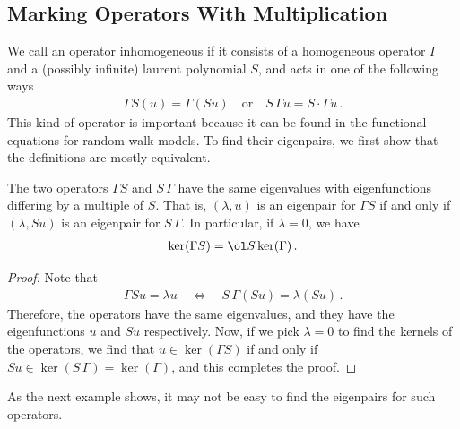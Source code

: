\subsection{Marking Operators With Multiplication}
We call an operator inhomogeneous if it consists of a homogeneous operator $\Gamma$ and a (possibly infinite) laurent polynomial $S$, and acts in one of the following ways
 \begin{align}
	\Gamma S(u) = \Gamma(Su)\quad\text{or}\quad S\,\Gamma u = S\cdot \Gamma u\,.
 \end{align}
This kind of operator is important because it can be found in the functional equations for random walk models. To find their eigenpairs, we first show that the definitions are mostly equivalent.
\begin{prop} The two operators $\Gamma S$ and $S\, \Gamma$ have the same eigenvalues with eigenfunctions differing by a multiple of $S$. That is, $(\lambda,u)$ is an eigenpair for $\Gamma S$ if and only if $(\lambda, Su)$ is an eigenpair for $S\,\Gamma$. In particular, if $\lambda = 0$, we have
\begin{align}
	\ker(\Gamma S) = \ol S \ker(\Gamma)\,.
\end{align}
\end{prop}
\begin{proof} Note that
\begin{align}
	\Gamma Su = \lambda u \quad \Longleftrightarrow \quad S\,\Gamma (Su) = \lambda (Su)\,.
\end{align}
Therefore, the operators have the same eigenvalues, and they have the eigenfunctions $u$ and $Su$ respectively. Now, if we pick $\lambda = 0$ to find the kernels of the operators, we find that $u \in \ker(\Gamma S)$ if and only if $Su \in \ker(S\,\Gamma) = \ker(\Gamma)$, and this completes the proof.
\end{proof}
As the next example shows, it may not be easy to find the eigenpairs for such operators.

